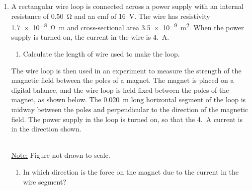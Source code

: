 \documentclass{../../../oss-classkick}
\begin{document}
\begin{enumerate}[leftmargin=15pt]
  Express all algebraic answers to the following parts in terms of the
  magnitude $F$ of the constant magnetic force, other quantities given above,
  and fundamental constants.
  \begin{enumerate}
  \item Determine the position $x$ of the projectile as a function of time $t$
    while it is on the rail if the projectile starts from rest at $x=0$ when
    $t=0$.
  \item Determine the speed of the projectile as it leaves the right-hand end
    of the track.
  \item Determine the energy supplied to the projectile by the rail gun.
  \item In what direction must the magnetic field $\mb{B}$ point in order to
    create the force $\mb{F}$? Explain your reasoning.
  \item Calculate the speed of the bar when it reaches the end of the rail
    given the following values.

    $B=\SI{5}{\tesla}$\hspace{.3in}
    $L=\SI{10}{\metre}$\hspace{.3in}
    $I=\SI{200}{\ampere}$\hspace{.3in}
    $M=\SI{.5}{\kilo\gram}$\hspace{.3in}
    $D=\SI{10}{\centi\metre}$
  \end{enumerate}
  \newpage

  
\item A rectangular wire loop is connected across a power supply with an
  internal resistance of \SI{.50}{\ohm} and an emf of \SI{16}{\volt}. The wire
  has resistivity \SI{1.7e-8}{\ohm\metre} and cross-sectional area
  \SI{3.5e-9}{\metre\squared}. When the power supply is turned on, the current
  in the wire is \SI{4.}{\ampere}.
  \begin{enumerate}
  \item Calculate the length of wire used to make the loop.
  \end{enumerate}

  \vspace{.1in}The wire loop is then used in an experiment to measure the
  strength of the magnetic field between the poles of a magnet. The magnet is
  placed on a digital balance, and the wire loop is held fixed between the
  poles of the magnet, as shown below. The \SI{.020}{\metre} long horizontal
  segment of the loop is midway between the poles and perpendicular to the
  direction of the magnetic field. The power supply in the loop is turned on,
  so that the \SI{4.}{\ampere} current is in the direction shown.
  \begin{center}
    \\
    \underline{Note:} Figure not drawn to scale.
  \end{center}
  \begin{enumerate}[resume]
  \item In which direction is the force on the magnet due to the current in the
    wire segment?


\end{enumerate}
\end{enumerate}
\end{document}
